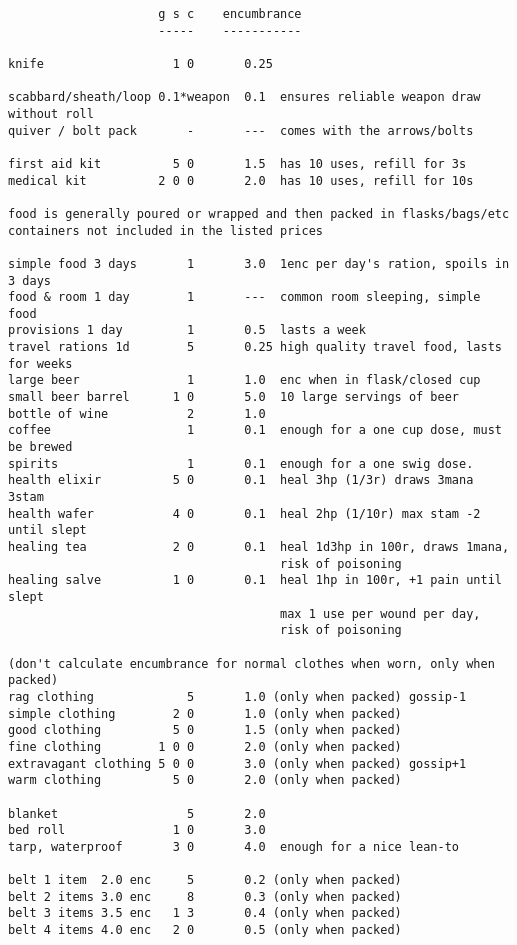 \small
\begin{verbatim}
                     g s c    encumbrance
                     -----    -----------

knife                  1 0       0.25

scabbard/sheath/loop 0.1*weapon  0.1  ensures reliable weapon draw without roll
quiver / bolt pack       -       ---  comes with the arrows/bolts

first aid kit          5 0       1.5  has 10 uses, refill for 3s
medical kit          2 0 0       2.0  has 10 uses, refill for 10s

food is generally poured or wrapped and then packed in flasks/bags/etc
containers not included in the listed prices

simple food 3 days       1       3.0  1enc per day's ration, spoils in 3 days
food & room 1 day        1       ---  common room sleeping, simple food
provisions 1 day         1       0.5  lasts a week
travel rations 1d        5       0.25 high quality travel food, lasts for weeks
large beer               1       1.0  enc when in flask/closed cup
small beer barrel      1 0       5.0  10 large servings of beer
bottle of wine           2       1.0
coffee                   1       0.1  enough for a one cup dose, must be brewed
spirits                  1       0.1  enough for a one swig dose.
health elixir          5 0       0.1  heal 3hp (1/3r) draws 3mana 3stam
health wafer           4 0       0.1  heal 2hp (1/10r) max stam -2 until slept
healing tea            2 0       0.1  heal 1d3hp in 100r, draws 1mana,
                                      risk of poisoning
healing salve          1 0       0.1  heal 1hp in 100r, +1 pain until slept
                                      max 1 use per wound per day,
                                      risk of poisoning

(don't calculate encumbrance for normal clothes when worn, only when packed)
rag clothing             5       1.0 (only when packed) gossip-1
simple clothing        2 0       1.0 (only when packed)
good clothing          5 0       1.5 (only when packed)
fine clothing        1 0 0       2.0 (only when packed)
extravagant clothing 5 0 0       3.0 (only when packed) gossip+1
warm clothing          5 0       2.0 (only when packed)

blanket                  5       2.0
bed roll               1 0       3.0
tarp, waterproof       3 0       4.0  enough for a nice lean-to

belt 1 item  2.0 enc     5       0.2 (only when packed)
belt 2 items 3.0 enc     8       0.3 (only when packed)
belt 3 items 3.5 enc   1 3       0.4 (only when packed)
belt 4 items 4.0 enc   2 0       0.5 (only when packed)


\end{verbatim}
